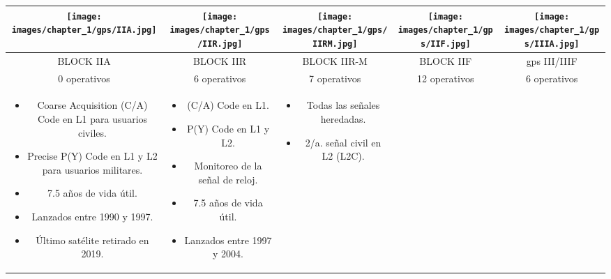 \begin{center}
\begin{longtable}{|c|c|c|c|c|}
        \texttt{[image: images/chapter\_1/gps/IIA.jpg]} &
        \texttt{[image: images/chapter\_1/gps/IIR.jpg]} &
        \texttt{[image: images/chapter\_1/gps/IIRM.jpg]} &
        \texttt{[image: images/chapter\_1/gps/IIF.jpg]} &
        \texttt{[image: images/chapter\_1/gps/IIIA.jpg]} \\
        \hline
        BLOCK IIA & BLOCK IIR & BLOCK IIR-M & BLOCK IIF & \gls{gps} III/IIIF \\
        \hline
        \cellcolor{darkgray}0 operativos & \cellcolor{fluorescentgreen}6 operativos & \cellcolor{fluorescentgreen}7 operativos & \cellcolor{fluorescentgreen}12 operativos & \cellcolor{fluorescentgreen}6 operativos \\
        \hline
        \parbox[t]{2.5cm}{
            {\fontsize{9}{11}\selectfont
                \begin{itemize}[leftmargin=*]
                    \item Coarse Acquisition (C/A) Code en L1 para usuarios civiles.
                    \item Precise P(Y) Code en L1 y L2 para usuarios militares.
                    \item 7.5 años de vida útil.
                    \item Lanzados entre 1990 y 1997.
                    \item Último satélite retirado en 2019.
                \end{itemize}
            }
        } &
        \parbox[t]{2.5cm}{
            {\fontsize{9}{11}\selectfont
                \begin{itemize}[leftmargin=*]
                    \item (C/A) Code en L1.
                    \item P(Y) Code en L1 y L2.
                    \item Monitoreo de la señal de reloj.
                    \item 7.5 años de vida útil.
                    \item Lanzados entre 1997 y 2004.
                \end{itemize}
            }
        } &
        \parbox[t]{2.5cm}{
            {\fontsize{9}{11}\selectfont
                \begin{itemize}[leftmargin=*]
                    \item Todas las señales heredadas.
                    \item 2/a. señal civil en L2 (L2C).

\end{itemize}}}
\end{longtable}
\end{center}
